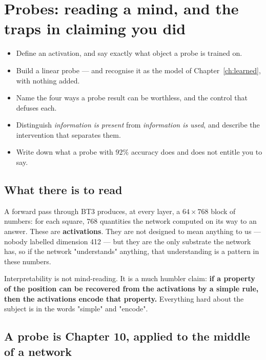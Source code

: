 \chapter{Probes: reading a mind, and the traps in claiming you did}
\label{ch:probes}

\begin{objectives}
\begin{itemize}
\item Define an activation, and say exactly what object a probe is trained on.
\item Build a linear probe --- and recognise it as the model of Chapter~\ref{ch:learned}, with
  nothing added.
\item Name the four ways a probe result can be worthless, and the control that defuses each.
\item Distinguish \emph{information is present} from \emph{information is used}, and describe
  the intervention that separates them.
\item Write down what a probe with $92\%$ accuracy does and does not entitle you to say.
\end{itemize}
\end{objectives}

\section{What there is to read}

A forward pass through BT3 produces, at every layer, a $64\times768$ block of numbers: for
each square, 768 quantities the network computed on its way to an answer. These are
\textbf{activations}. They are not designed to mean anything to us --- nobody labelled
dimension 412 --- but they are the only substrate the network has, so if the network
"understands" anything, that understanding is a pattern in these numbers.

\begin{keyidea}
Interpretability is not mind-reading. It is a much humbler claim: \textbf{if a property of the
position can be recovered from the activations by a simple rule, then the activations encode
that property.} Everything hard about the subject is in the words "simple" and "encode".
\end{keyidea}

\section{A probe is Chapter 10, applied to the middle of a network}

